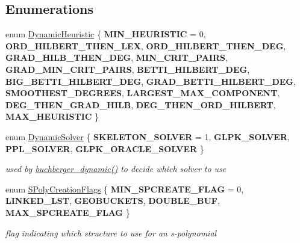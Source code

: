 \subsection*{Enumerations}
\begin{DoxyCompactItemize}
\item 
enum \hyperlink{group___g_b_computation_ga498e6d10e581ed9dca25264cbe825ce0}{Dynamic\+Heuristic} \{ \newline
{\bfseries M\+I\+N\+\_\+\+H\+E\+U\+R\+I\+S\+T\+IC} = 0, 
{\bfseries O\+R\+D\+\_\+\+H\+I\+L\+B\+E\+R\+T\+\_\+\+T\+H\+E\+N\+\_\+\+L\+EX}, 
{\bfseries O\+R\+D\+\_\+\+H\+I\+L\+B\+E\+R\+T\+\_\+\+T\+H\+E\+N\+\_\+\+D\+EG}, 
{\bfseries G\+R\+A\+D\+\_\+\+H\+I\+L\+B\+\_\+\+T\+H\+E\+N\+\_\+\+D\+EG}, 
\newline
{\bfseries M\+I\+N\+\_\+\+C\+R\+I\+T\+\_\+\+P\+A\+I\+RS}, 
{\bfseries G\+R\+A\+D\+\_\+\+M\+I\+N\+\_\+\+C\+R\+I\+T\+\_\+\+P\+A\+I\+RS}, 
{\bfseries B\+E\+T\+T\+I\+\_\+\+H\+I\+L\+B\+E\+R\+T\+\_\+\+D\+EG}, 
{\bfseries B\+I\+G\+\_\+\+B\+E\+T\+T\+I\+\_\+\+H\+I\+L\+B\+E\+R\+T\+\_\+\+D\+EG}, 
\newline
{\bfseries G\+R\+A\+D\+\_\+\+B\+E\+T\+T\+I\+\_\+\+H\+I\+L\+B\+E\+R\+T\+\_\+\+D\+EG}, 
{\bfseries S\+M\+O\+O\+T\+H\+E\+S\+T\+\_\+\+D\+E\+G\+R\+E\+ES}, 
{\bfseries L\+A\+R\+G\+E\+S\+T\+\_\+\+M\+A\+X\+\_\+\+C\+O\+M\+P\+O\+N\+E\+NT}, 
{\bfseries D\+E\+G\+\_\+\+T\+H\+E\+N\+\_\+\+G\+R\+A\+D\+\_\+\+H\+I\+LB}, 
\newline
{\bfseries D\+E\+G\+\_\+\+T\+H\+E\+N\+\_\+\+O\+R\+D\+\_\+\+H\+I\+L\+B\+E\+RT}, 
{\bfseries M\+A\+X\+\_\+\+H\+E\+U\+R\+I\+S\+T\+IC}
 \}
\item 
enum \hyperlink{group___g_b_computation_ga28fbbb9eb7d8b80ced05c8fa89b2bdac}{Dynamic\+Solver} \{ {\bfseries S\+K\+E\+L\+E\+T\+O\+N\+\_\+\+S\+O\+L\+V\+ER} = 1, 
{\bfseries G\+L\+P\+K\+\_\+\+S\+O\+L\+V\+ER}, 
{\bfseries P\+P\+L\+\_\+\+S\+O\+L\+V\+ER}, 
{\bfseries G\+L\+P\+K\+\_\+\+O\+R\+A\+C\+L\+E\+\_\+\+S\+O\+L\+V\+ER}
 \}\begin{DoxyCompactList}\small\item\em used by \hyperlink{group___g_b_computation_ga40140d94eac91d7337f553d362128cb7}{buchberger\+\_\+dynamic()} to decide which solver to use \end{DoxyCompactList}
\item 
enum \hyperlink{group___g_b_computation_ga73257b8a2d5cc826853a71b77d0cebf2}{S\+Poly\+Creation\+Flags} \{ \newline
{\bfseries M\+I\+N\+\_\+\+S\+P\+C\+R\+E\+A\+T\+E\+\_\+\+F\+L\+AG} = 0, 
{\bfseries L\+I\+N\+K\+E\+D\+\_\+\+L\+ST}, 
{\bfseries G\+E\+O\+B\+U\+C\+K\+E\+TS}, 
{\bfseries D\+O\+U\+B\+L\+E\+\_\+\+B\+UF}, 
\newline
{\bfseries M\+A\+X\+\_\+\+S\+P\+C\+R\+E\+A\+T\+E\+\_\+\+F\+L\+AG}
 \}\begin{DoxyCompactList}\small\item\em flag indicating which structure to use for an s-\/polynomial \end{DoxyCompactList}
\end{DoxyCompactItemize}
